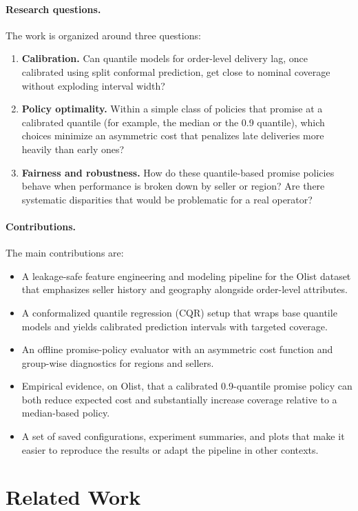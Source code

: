 \documentclass[10pt,twocolumn]{article}
\begin{document}
\paragraph{Research questions.}
The work is organized around three questions:
\begin{enumerate}
  \item \textbf{Calibration.} Can quantile models for order-level delivery lag, once calibrated using split conformal prediction, get close to nominal coverage without exploding interval width?
  \item \textbf{Policy optimality.} Within a simple class of policies that promise at a calibrated quantile (for example, the median or the 0.9 quantile), which choices minimize an asymmetric cost that penalizes late deliveries more heavily than early ones?
  \item \textbf{Fairness and robustness.} How do these quantile-based promise policies behave when performance is broken down by seller or region? Are there systematic disparities that would be problematic for a real operator?
\end{enumerate}

\paragraph{Contributions.}
The main contributions are:
\begin{itemize}
  \item A leakage-safe feature engineering and modeling pipeline for the Olist dataset that emphasizes seller history and geography alongside order-level attributes.
  \item A conformalized quantile regression (CQR) setup that wraps base quantile models and yields calibrated prediction intervals with targeted coverage.
  \item An offline promise-policy evaluator with an asymmetric cost function and group-wise diagnostics for regions and sellers.
  \item Empirical evidence, on Olist, that a calibrated 0.9-quantile promise policy can both reduce expected cost and substantially increase coverage relative to a median-based policy.
  \item A set of saved configurations, experiment summaries, and plots that make it easier to reproduce the results or adapt the pipeline in other contexts.
\end{itemize}

\section{Related Work}
\end{document}
